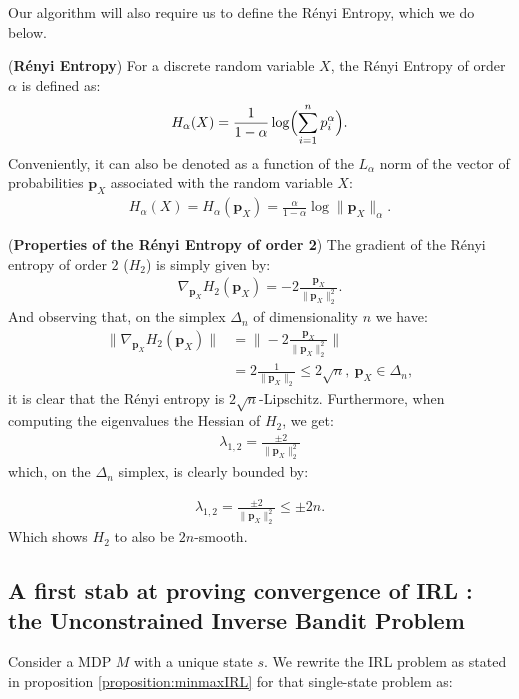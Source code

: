 Our algorithm will also require us to define the Rényi Entropy, which we do below.
\begin{definition}
    (\textbf{Rényi Entropy}) For a discrete random variable $X$, the Rényi Entropy of order $\alpha$ is defined as: 
    \[H_\alpha(X) = \frac{1}{1-\alpha} \log \Bigl( \sum^n_{i=1}p_i^\alpha \Bigr). \]
    Conveniently, it can also be denoted as a function of the $L_\alpha$ norm of the vector of probabilities $\bm{p}_X$ associated with the random variable $X$:
    \begin{align*}
        H_\alpha(X)= H_\alpha(\bm{p}_X)= \frac{\alpha}{1- \alpha} \log \|\bm{p}_X \|_\alpha.
    \end{align*}
\end{definition}

\begin{observation}
    (\textbf{Properties of the Rényi Entropy of order 2})
    The gradient of the Rényi entropy of order $2$ ($H_2$) is simply given by:
    \begin{align*}
        \nabla_{\bm{p}_X} H_2(\bm{p}_X) 
         = -2 \frac{ \bm{p}_X  }{\|\bm{p}_X \|_2^2}.
    \end{align*}
    And observing that, on the simplex $\Delta_n$ of dimensionality $n$ we have:
    \begin{align*}
        \|\nabla_{\bm{p}_X} H_2(\bm{p}_X)\| &= \Bigg\| -2 \frac{ \bm{p}_X  }{\|\bm{p}_X \|_2^2} \Bigg\| \\
        &= 2 \frac{ 1 }{\|  \bm{p}_X  \|_2 } \leq 2 \sqrt{n}, ~ \bm{p}_X \in \Delta_n,
    \end{align*}
    it is clear that the Rényi entropy is $2\sqrt{n}$-Lipschitz. Furthermore, when computing the eigenvalues the Hessian of $H_2$, we get:
    \begin{align*}
        \lambda_{1,2} = \frac{\pm 2}{\|\bm{p}_X \|_2^2}
    \end{align*}
    which, on the $\Delta_n$ simplex, is clearly bounded by:
    
    
    \begin{align*}
        \lambda_{1,2} = \frac{\pm 2}{\|\bm{p}_X \|_2^2} \leq \pm 2 n.
    \end{align*}
    Which shows $H_2$ to also be $2n$-smooth.
\end{observation}

\subsection{A first stab at proving convergence of IRL : the Unconstrained Inverse Bandit Problem} \label{sec:unconstrained_bandit_problem}
Consider a MDP $\textit{M}$ with a unique state $s$. We rewrite the IRL problem as stated in proposition \ref{proposition:minmaxIRL} for that single-state problem as:

